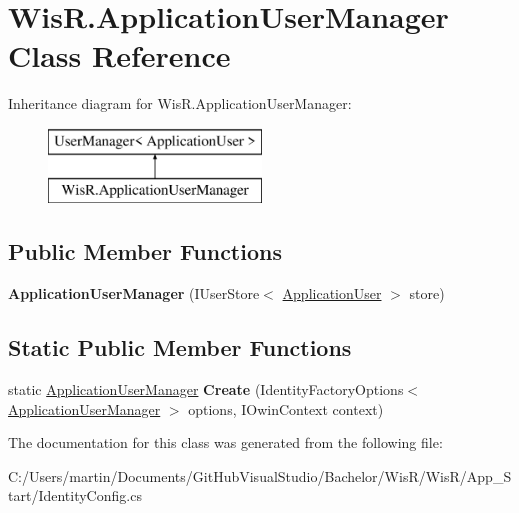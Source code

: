 \hypertarget{class_wis_r_1_1_application_user_manager}{}\section{Wis\+R.\+Application\+User\+Manager Class Reference}
\label{class_wis_r_1_1_application_user_manager}
Inheritance diagram for Wis\+R.\+Application\+User\+Manager\+:\begin{figure}[H]
\begin{center}
\leavevmode
\includegraphics[height=2.000000cm]{class_wis_r_1_1_application_user_manager}
\end{center}
\end{figure}
\subsection*{Public Member Functions}
\begin{DoxyCompactItemize}
\item 
\hypertarget{class_wis_r_1_1_application_user_manager_aa3c6032ff8dd1954c9b0e6aaaca06c53}{}{\bfseries Application\+User\+Manager} (I\+User\+Store$<$ \hyperlink{class_wis_r_1_1_models_1_1_application_user}{Application\+User} $>$ store)\label{class_wis_r_1_1_application_user_manager_aa3c6032ff8dd1954c9b0e6aaaca06c53}

\end{DoxyCompactItemize}
\subsection*{Static Public Member Functions}
\begin{DoxyCompactItemize}
\item 
\hypertarget{class_wis_r_1_1_application_user_manager_a9e0306a683653453c32521f8581441fb}{}static \hyperlink{class_wis_r_1_1_application_user_manager}{Application\+User\+Manager} {\bfseries Create} (Identity\+Factory\+Options$<$ \hyperlink{class_wis_r_1_1_application_user_manager}{Application\+User\+Manager} $>$ options, I\+Owin\+Context context)\label{class_wis_r_1_1_application_user_manager_a9e0306a683653453c32521f8581441fb}

\end{DoxyCompactItemize}


The documentation for this class was generated from the following file\+:\begin{DoxyCompactItemize}
\item 
C\+:/\+Users/martin/\+Documents/\+Git\+Hub\+Visual\+Studio/\+Bachelor/\+Wis\+R/\+Wis\+R/\+App\+\_\+\+Start/Identity\+Config.\+cs\end{DoxyCompactItemize}
